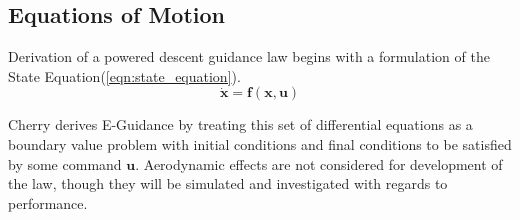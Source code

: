 %
%
%
%
%
%
%











\subsection{Equations of Motion}\label{sec:EOMS}
Derivation of a powered descent guidance law begins with a formulation of the State Equation\:(\ref{eqn:state_equation}).
\begin{equation}
\dot{\bm{x}} = \bm{f}(\bm{x,\bm{u}})
\label{eqn:state_equation}
\end{equation}

Cherry derives E-Guidance by treating this set of differential equations as a boundary value problem with initial conditions and final conditions to be satisfied by some command $\bm{u}$. Aerodynamic effects are not considered for development of the law, though they will be simulated and investigated with regards to performance.

